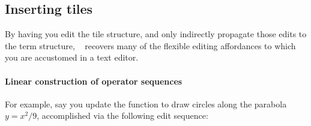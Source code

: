 



\subsection{Inserting tiles}
By having you edit the tile structure, and only
indirectly propagate those edits to the term structure,
\tylr~ recovers many of the flexible editing affordances to
which you are accustomed in a text editor.

\paragraph{Linear construction of operator sequences}
For example, say you update the function to
draw circles along the parabola $y = x^2/9$,
accomplished via the following edit sequence:

